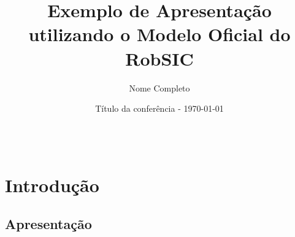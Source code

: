 \documentclass[12pt, xcolor=table, aspectratio=169]{beamer}
\title{Exemplo de Apresentação utilizando o Modelo Oficial do RobSIC}
\author[Autor]{Nome Completo}
\institute[RobSIC]{RobSIC - Laboratório de Robótica, Sistemas Inteligentes e Complexos}
\date[SIGLA 22]{Título da conferência - \today} %
\makeatletter
\newcommand*{\currentname}{\@currentlabelname}
\makeatother
\begin{document}
\begin{frame}
  \titlepage
\end{frame}



\begin{frame}
  \frametitle{\currentname}

  



  \begin{columns}[onlytextwidth,T]
    \begin{column}{.45\textwidth}
      \tableofcontents[sections=1-2]
    \end{column}
    \begin{column}{.45\textwidth}
      \tableofcontents[sections=3-5]
    \end{column}
  \end{columns}
  
\end{frame}



\section[Introdução]{Introdução}

\subsection[Apresentação]{Apresentação}
\end{document}
